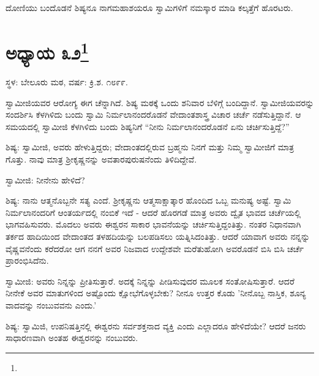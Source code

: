 ದೋಣಿಯು ಬಂದೊಡನೆ ಶಿಷ್ಯನೂ ನಾಗಮಹಾಶಯರೂ ಸ್ವಾಮಿಗಳಿಗೆ ನಮಸ್ಕಾರ ಮಾಡಿ ಕಲ್ಕತ್ತೆಗೆ ಹೊರಟರು.

\newpage

\chapter[ಅಧ್ಯಾಯ ೩೨]{ಅಧ್ಯಾಯ ೩೨\protect\footnote{}}

\begin{center}
ಸ್ಥಳ: ಬೇಲೂರು ಮಠ, ವರ್ಷ: ಕ್ರಿ.ಶ. ೧೮೯೯.
\end{center}

ಸ್ವಾಮೀಜಿಯವರ ಆರೋಗ್ಯ ಈಗ ಚೆನ್ನಾಗಿದೆ. ಶಿಷ್ಯ ಮಠಕ್ಕೆ ಒಂದು ಶನಿವಾರ ಬೆಳಿಗ್ಗೆ ಬಂದಿದ್ದಾನೆ. ಸ್ವಾಮೀಜಿಯವರನ್ನು ಸಂದರ್ಶಿಸಿ ಕೆಳಗಿಳಿದು ಬಂದು ಸ್ವಾಮಿ ನಿರ್ಮಲಾನಂದರೊಡನೆ ವೇದಾಂತಶಾಸ್ತ್ರ ವಿಚಾರ ಚರ್ಚೆ ನಡೆಸುತ್ತಿದ್ದಾನೆ. ಆ ಸಮಯದಲ್ಲಿ ಸ್ವಾಮೀಜಿ ಕೆಳಗಿಳಿದು ಬಂದು ಶಿಷ್ಯನಿಗೆ “ನೀನು ನಿರ್ಮಲಾನಂದರೊಡನೆ ಏನು ಚರ್ಚಿಸುತ್ತಿದ್ದೆ?”

ಶಿಷ್ಯ: ಸ್ವಾಮೀಜಿ, ಅವರು ಹೇಳುತ್ತಿದ್ದರು; ವೇದಾಂತದಲ್ಲಿರುವ ಬ್ರಹ್ಮನು ನಿನಗೆ ಮತ್ತು ನಿಮ್ಮ ಸ್ವಾಮೀಜಿಗೆ ಮಾತ್ರ ಗೊತ್ತು. ನಾವು ಮಾತ್ರ ಶ‍್ರೀಕೃಷ್ಣನನ್ನು ಅವತಾರಪುರುಷನೆಂದು ತಿಳಿದಿದ್ದೇವೆ.

ಸ್ವಾಮೀಜಿ: ನೀನೇನು ಹೇಳಿದೆ?

ಶಿಷ್ಯ: ನಾನು ಆತ್ಮನೊಬ್ಬನೇ ಸತ್ಯ ಎಂದೆ. ಶ‍್ರೀಕೃಷ್ಣನು ಆತ್ಮಸಾಕ್ಷಾತ್ಕಾರ ಹೊಂದಿದ ಒಬ್ಬ ಮನುಷ್ಯ ಅಷ್ಟೆ. ಸ್ವಾಮಿ ನಿರ್ಮಲಾನಂದರಿಗೆ ಆಂತರ್ಯದಲ್ಲಿ ನಂಬಿಕೆ ಇದೆ - ಆದರೆ ಹೊರಗಡೆ ಮಾತ್ರ ಅವರು ದ್ವೈತ ಭಾವದ ಚರ್ಚೆಯಲ್ಲಿ ಭಾಗವಹಿಸುವರು. ಮೊದಲು ಅವರು ಈಶ್ವರನ ಸಾಕಾರ ಭಾವನೆಯನ್ನು ಚರ್ಚಿಸುತ್ತಿದ್ದಂತಿತ್ತು. ನಂತರ ನಿಧಾನವಾಗಿ ತರ್ಕದ ಹಾದಿಯಿಂದ ವೇದಾಂತದ ತಳಹದಿಯನ್ನು ಬಲಪಡಿಸಲು ಯತ್ನಿಸಿದಂತಿತ್ತು. ಆದರೆ ಯಾವಾಗ ಅವರು ನನ್ನನ್ನು ವೈಷ್ಣವನೆಂದು ಕರೆದರೋ ಆಗ ನನಗೆ ಅವರ ನಿಜವಾದ ಉದ್ದೇಶವೇ ಮರೆತುಹೋಗಿ ಅವರೊಡನೆ ಬಿಸಿ ಬಿಸಿ ಚರ್ಚೆ ಪ್ರಾರಂಭಿಸಿದೆನು.

ಸ್ವಾಮೀಜಿ: ಅವರು ನಿನ್ನನ್ನು ಪ್ರೀತಿಸುತ್ತಾರೆ. ಅದಕ್ಕೆ ನಿನ್ನನ್ನು ಪೀಡಿಸುವುದರ ಮೂಲಕ ಸಂತೋಷಿಸುತ್ತಾರೆ. ಆದರೆ ನೀನೇಕೆ ಅವರ ಮಾತುಗಳಿಂದ ಅಷ್ಟೊಂದು ಕ್ಷೋಭೆಗೊಳ್ಳಬೇಕು? ನೀನೂ ಉತ್ತರ ಕೊಡು 'ನೀನೊಬ್ಬ ನಾಸ್ತಿಕ, ಶೂನ್ಯ ವಾದವನ್ನು ನಂಬುವವನು ಎಂದು.'

ಶಿಷ್ಯ: ಸ್ವಾಮಿಜಿ, ಉಪನಿಷತ್ತಿನಲ್ಲಿ ಈಶ್ವರನು ಸರ್ವಶಕ್ತನಾದ ವ್ಯಕ್ತಿ ಎಂದು ಎಲ್ಲಾದರೂ ಹೇಳಿದೆಯೇ? ಆದರೆ ಜನರು ಸಾಧಾರಣವಾಗಿ ಅಂತಹ ಈಶ್ವರನನ್ನು ನಂಬುವರು.

